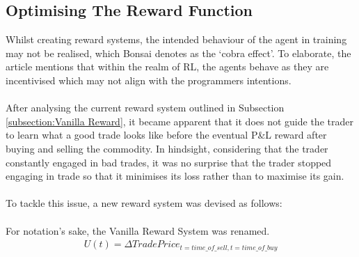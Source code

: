 \documentclass[ %
                    author={Ashwinder Khurana},
                supervisor={Prof Dave Cliff},
                    degree={MEng},
                     title={The Deeply Reinforced Trader},
                  subtitle={},
                      type={enterprise},
                      year={2020} ]{dissertation}
\begin{document}
{{\color{red}{Add the average loss per bad trade and average profit from good trades}}

\subsection{Optimising The Reward Function}
Whilst creating reward systems, the intended behaviour of the agent in training may not be realised, which Bonsai denotes as the \enquote*{cobra effect}\cite{https://medium.com/@BonsaiAI/deep-reinforcement-learning-models-tips-tricks-for-writing-reward-functions-a84fe525e8e0}. To elaborate, the article mentions that within the realm of RL, the agents behave as they are incentivised which may not align with the programmers intentions. 
\\
\\
After analysing the current reward system outlined in Subsection \ref{subsection:Vanilla Reward}, it became apparent that it does not guide the trader to learn what a good trade looks like before the eventual P\&L reward after buying and selling the commodity. In hindsight, considering that the trader constantly engaged in bad trades, it was no surprise that the trader stopped engaging in trade so that it minimises its loss rather than to maximise its gain. 
\\
\\
To tackle this issue, a new reward system was devised as follows:
\\
\\
For notation's sake, the Vanilla Reward System was renamed.
\begin{equation}
\label{Vanilla Reward}
\begin{split}
U(t) = \Delta TradePrice_{t=time\_of\_ sell, t=time\_of\_buy}
\end{split}
\end{equation}

}
\end{document}

